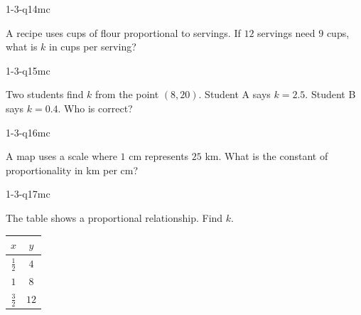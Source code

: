 \begin{practiceQuestion}{1-3-q14}{mc}
\begin{questionText}
A recipe uses cups of flour proportional to servings. If $12$ servings need $9$ cups, what is $k$ in cups per serving?
\end{questionText}
\end{practiceQuestion}

\begin{practiceQuestion}{1-3-q15}{mc}
\begin{questionText}
Two students find $k$ from the point $(8, 20)$. Student A says $k = 2.5$. Student B says $k = 0.4$. Who is correct?
\end{questionText}
\end{practiceQuestion}

\begin{practiceQuestion}{1-3-q16}{mc}
\begin{questionText}
A map uses a scale where $1$ cm represents $25$ km. What is the constant of proportionality in km per cm?
\end{questionText}
\end{practiceQuestion}

\begin{practiceQuestion}{1-3-q17}{mc}
\begin{questionText}
The table shows a proportional relationship. Find $k$.

\begin{center}
\begin{tabular}{|c|c|}
\hline $x$ & $y$ \\ \hline $\frac{1}{2}$ & $4$ \\ $1$ & $8$ \\ $\frac{3}{2}$ & $12$ \\ \hline
\end{tabular}
\end{center}
\end{questionText}
\end{practiceQuestion}

